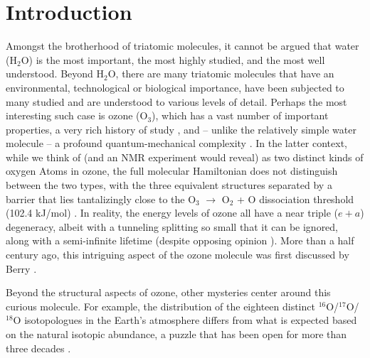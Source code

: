 \documentclass[12pt,a4paper,prb,aps,superscriptaddress]{revtex4}
\begin{document}
\maketitle

\section{Introduction}

Amongst the brotherhood of triatomic molecules, it cannot be argued that water
(H$_2$O) is the most important, the most highly studied, and the most well
understood.  Beyond H$_2$O, there are many triatomic molecules that have an
environmental, technological or biological importance, have been subjected to
many studied and are understood to various levels of detail.  Perhaps the most
interesting such case is ozone (O$_3$), which has a vast number of important
properties, a very rich history of study \cite{chappuis}, and – unlike the
relatively simple water molecule – a profound quantum-mechanical complexity
\cite{Babikov:anomalousOzone:2003}.  In the latter context, while we think of
(and an NMR experiment would reveal) as two distinct kinds of oxygen Atoms in
ozone, the full molecular Hamiltonian does not distinguish between the two
types, with the three equivalent structures separated by a barrier that lies
tantalizingly close to the O$_3$ $\rightarrow$ O$_2$ + O dissociation
threshold (102.4 kJ/mol) \cite{Ruscis:ATcT:2022}. In reality, the energy
levels of ozone all have a near triple ($e+a$) degeneracy, albeit with a
tunneling splitting so small that it can be ignored, along with a
semi-infinite lifetime (despite opposing opinion
\cite{Boggs:BerryOzone:2006}).   More than a half century ago, this intriguing
aspect of the ozone molecule was first discussed by Berry
\cite{Berry:Ozone:1960}.

Beyond the structural aspects of ozone, other mysteries center around this
curious molecule.  For example, the distribution of the eighteen distinct
$^{16}$O/$^{17}$O/$^{18}$O isotopologues in the Earth’s atmosphere differs
from what is expected based on the natural isotopic abundance, a puzzle that
has been open for more than three decades
\cite{Mauersberger:OzoneMystery:1990}. 
\end{document}
